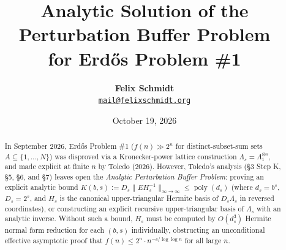\documentclass[11pt,a4paper]{article}
\title{\textbf{Analytic Solution of the Perturbation Buffer Problem\\for Erd\H{o}s Problem \#1}}
\author{\textbf{Felix Schmidt}\\
\small \href{mailto:mail@felixschmidt.org}{\texttt{mail@felixschmidt.org}}}
\date{October 19, 2026}
\theoremstyle{plain}
\theoremstyle{definition}
\newcommand{\poly}{\operatorname{poly}}
\begin{document}
\maketitle

\begin{abstract}
In September 2026, Erd\H{o}s Problem \#1 ($f(n) \gg 2^n$ for distinct-subset-sum sets $A \subseteq \{1,\dots,N\}$) was disproved via a Kronecker-power lattice construction $\Lambda_s = \Lambda_1^{\otimes s}$, and made explicit at finite $n$ by Toledo (2026). However, Toledo's analysis (\S 3 Step K, \S 5, \S 6, and \S 7) leaves open the \emph{Analytic Perturbation Buffer Problem}: proving an explicit analytic bound $K(b,s) := D_s \|E H_s^{-1}\|_{\infty \to \infty} \le \poly(d_s)$ (where $d_s = b^s$, $D_s = 2^s$, and $H_s$ is the canonical upper-triangular Hermite basis of $D_s \Lambda_s$ in reversed coordinates), or constructing an explicit recursive upper-triangular basis of $\Lambda_s$ with an analytic inverse. Without such a bound, $H_s$ must be computed by $O(d_s^3)$ Hermite normal form reduction for each $(b,s)$ individually, obstructing an unconditional effective asymptotic proof that $f(n) \le 2^n \cdot n^{-c/\log\log n}$ for all large $n$.


\end{abstract}
\end{document}
